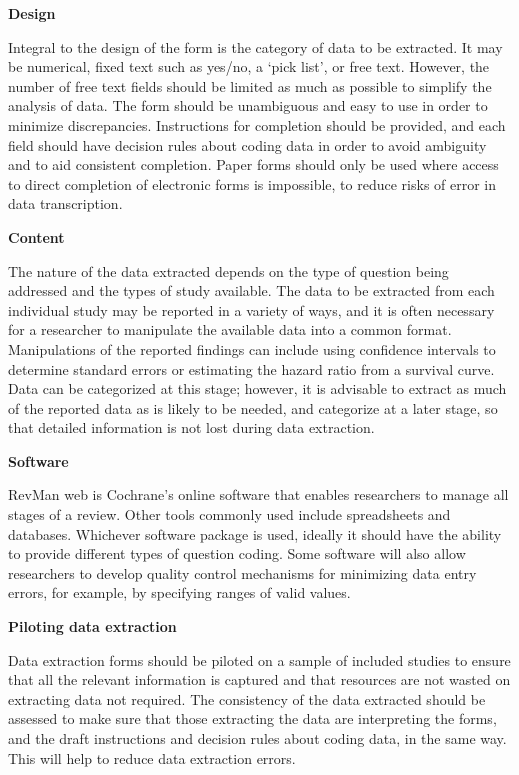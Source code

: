 \documentclass[
  10pt,
  a4paper,
  DIV=11,
  numbers=noendperiod]{scrreprt}
\begin{document}
\textbf{Design}

Integral to the design of the form is the category of data to be
extracted. It may be numerical, fixed text such as yes/no, a `pick
list', or free text. However, the number of free text fields should be
limited as much as possible to simplify the analysis of data. The form
should be unambiguous and easy to use in order to minimize
discrepancies. Instructions for completion should be provided, and each
field should have decision rules about coding data in order to avoid
ambiguity and to aid consistent completion. Paper forms should only be
used where access to direct completion of electronic forms is
impossible, to reduce risks of error in data transcription.

\textbf{Content}

The nature of the data extracted depends on the type of question being
addressed and the types of study available. The data to be extracted
from each individual study may be reported in a variety of ways, and it
is often necessary for a researcher to manipulate the available data
into a common format. Manipulations of the reported findings can include
using confidence intervals to determine standard errors or estimating
the hazard ratio from a survival curve. Data can be categorized at this
stage; however, it is advisable to extract as much of the reported data
as is likely to be needed, and categorize at a later stage, so that
detailed information is not lost during data extraction.

\textbf{Software}

RevMan web is Cochrane's online software that enables researchers to
manage all stages of a review. Other tools commonly used include
spreadsheets and databases. Whichever software package is used, ideally
it should have the ability to provide different types of question
coding. Some software will also allow researchers to develop quality
control mechanisms for minimizing data entry errors, for example, by
specifying ranges of valid values.

\textbf{Piloting data extraction}

Data extraction forms should be piloted on a sample of included studies
to ensure that all the relevant information is captured and that
resources are not wasted on extracting data not required. The
consistency of the data extracted should be assessed to make sure that
those extracting the data are interpreting the forms, and the draft
instructions and decision rules about coding data, in the same way. This
will help to reduce data extraction errors.
\end{document}
